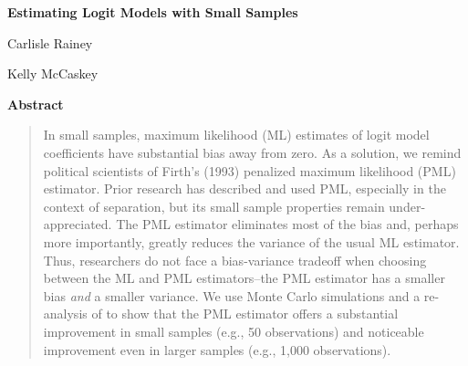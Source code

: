 \documentclass[12pt]{article}
\begin{document}
\begin{center}
{\LARGE{\textbf{Estimating Logit Models with Small Samples}}
}\\\vspace{2mm}

\vspace{10mm}

Carlisle Rainey

\vspace{3mm}

Kelly McCaskey

\end{center}

\vspace{10mm}

{\centerline{\textbf{Abstract}}}
\begin{quote}\noindent
In small samples, maximum likelihood (ML) estimates of logit model coefficients have substantial bias away from zero.
As a solution, we remind political scientists of Firth's (1993) penalized maximum likelihood (PML) estimator. 
Prior research has described and used PML, especially in the context of separation, but its small sample properties remain under-appreciated.
The PML estimator eliminates most of the bias and, perhaps more importantly, greatly reduces the variance of the usual ML estimator.
Thus, researchers do not face a bias-variance tradeoff when choosing between the ML and PML estimators--the PML estimator has a smaller bias \textit{and} a smaller variance.
We use Monte Carlo simulations and a re-analysis of \cite{GeorgeEpstein1992} to show that the PML estimator offers a substantial improvement in small samples (e.g., 50 observations) and noticeable improvement even in larger samples (e.g., 1,000 observations).
 \end{quote}
\end{document}
